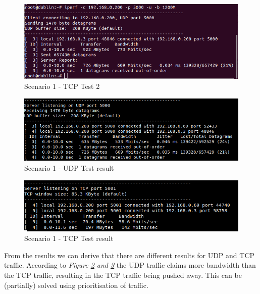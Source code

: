 \documentclass{article}
\begin{document}
\begin{figure}[H]
\includegraphics[width=14cm]{figures/q2-2-1-tcp-2.png}
\centering
\caption{Scenario 1 - TCP Test 2}
\centering
\label{fig:throughput_tcp_test_2}
\end{figure}


\begin{figure}[H]
\includegraphics[width=14cm]{figures/q2-2-1-udp-result.png}
\centering
\caption{Scenario 1 - UDP Test result}
\centering
\label{fig:throughput_udp_result}
\end{figure}


\begin{figure}[H]
\includegraphics[width=14cm]{figures/q2-2-1-tcp-result.png}
\centering
\caption{Scenario 1 - TCP Test result}
\centering
\label{fig:throughput_tcp_result}
\end{figure}

From the results we can derive that there are different results for UDP and TCP traffic. According to \textit{Figure \ref{fig:throughput_udp_result} and \ref{fig:throughput_tcp_result}} the UDP traffic claims more bandwidth than the TCP traffic, resulting in the TCP traffic being pushed away. This can be (partially) solved using prioritisation of traffic.
\end{document}
